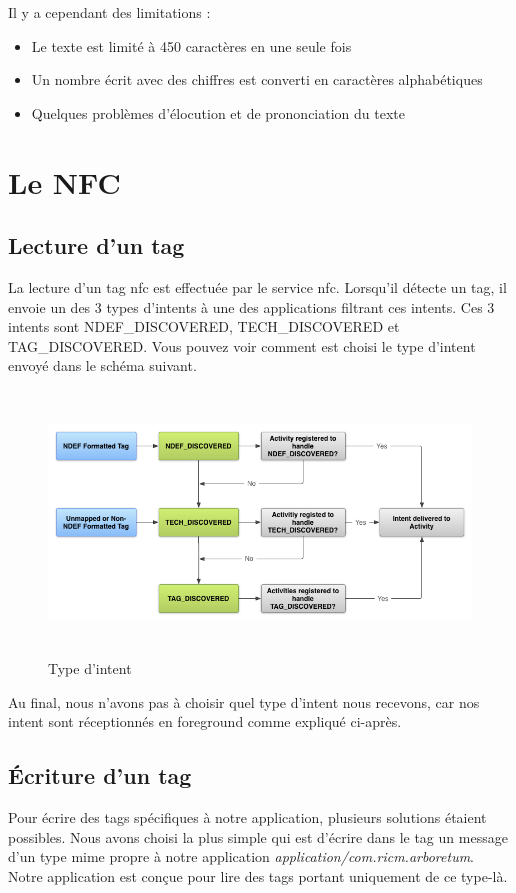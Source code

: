\documentclass[a4paper,11pt]{article}
\begin{document}
		Il y a cependant des limitations :
		\begin{itemize}
		\item Le texte est limité à 450 caractères en une seule fois
		\item Un nombre écrit avec des chiffres est converti en caractères alphabétiques
		\item Quelques problèmes d'élocution et de prononciation du texte
		 
		\end{itemize}
    \newpage
    \section{Le NFC}
      \subsection{Lecture d’un tag}
      La lecture d’un tag nfc est effectuée par le service nfc. Lorsqu’il détecte un tag, il envoie un des 3 types d’intents à une des applications 
      filtrant ces intents. Ces 3 intents sont NDEF\_DISCOVERED, TECH\_DISCOVERED et TAG\_DISCOVERED. 
      Vous pouvez voir comment est choisi le type d’intent envoyé dans le schéma suivant.
    \begin{figure}[H]
     \begin{center}
      \includegraphics[width=15cm,height=7cm]{nfc_tag_dispatch.png}
      \caption{Type d'intent}
     \end{center}
    \end{figure}
      Au final, nous n’avons pas à choisir quel type d’intent nous recevons, car nos intent sont réceptionnés en foreground comme expliqué ci-après.
      
      \subsection{Écriture d'un tag}
      Pour écrire des tags spécifiques à notre application, plusieurs solutions étaient possibles.
      Nous avons choisi la plus simple qui est d’écrire dans le tag un message d’un type mime propre à notre application \textit{application/com.ricm.arboretum}. 
      Notre application est conçue pour lire des tags portant uniquement de ce type-là.
      
\end{document}
